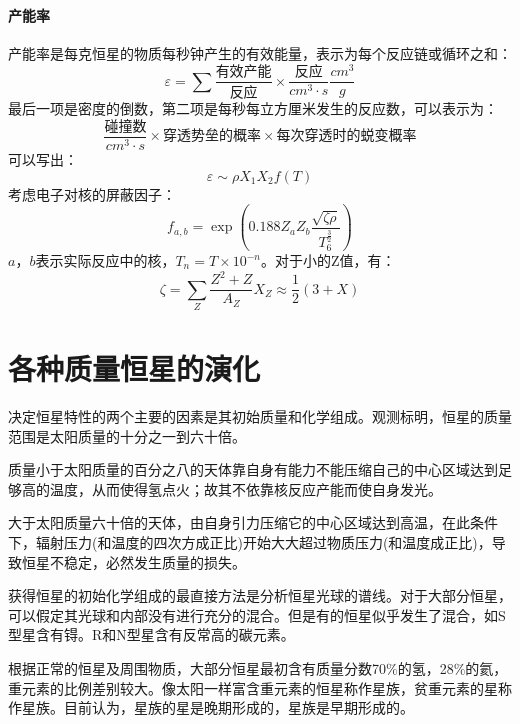 \paragraph{产能率}
产能率是每克恒星的物质每秒钟产生的有效能量，表示为每个反应链或循环之和：
\begin{equation}
	\varepsilon=\sum \frac{\mbox{有效产能}}{\mbox{反应}}\times\frac{\mbox{反应}}{cm^3\cdot s}\frac{cm^3}{g}
\end{equation}
最后一项是密度的倒数，第二项是每秒每立方厘米发生的反应数，可以表示为：
\begin{equation}
	\frac{\mbox{碰撞数}}{cm^3\cdot s}\times \mbox{穿透势垒的概率}\times\mbox{每次穿透时的蜕变概率}
\end{equation}
可以写出：
\begin{equation}
	\varepsilon \sim \rho X_{1}X_{2}f(T)
\end{equation}
考虑电子对核的屏蔽因子：
\begin{equation}
	f_{a,b}=\exp(0.188Z_{a}Z_{b}\frac{\sqrt{\zeta\rho}}{T_{6}^{\frac{3}{2}}})
\end{equation}
$a$，$b$表示实际反应中的核，$T_{n}=T\times 10^{-n}$。对于小的Z值，有：
\begin{equation}
	\zeta=\sum_{Z}\frac{Z^2+Z}{A_{Z}}X_{Z}\approx \frac{1}{2}(3+X)
\end{equation}

\section{各种质量恒星的演化}
决定恒星特性的两个主要的因素是其初始质量和化学组成。观测标明，恒星的质量范围是太阳质量的十分之一到六十倍。

质量小于太阳质量的百分之八的天体靠自身有能力不能压缩自己的中心区域达到足够高的温度，从而使得氢点火；故其不依靠核反应产能而使自身发光。

大于太阳质量六十倍的天体，由自身引力压缩它的中心区域达到高温，在此条件下，辐射压力(和温度的四次方成正比)开始大大超过物质压力(和温度成正比)，导致恒星不稳定，必然发生质量的损失。

获得恒星的初始化学组成的最直接方法是分析恒星光球的谱线。对于大部分恒星，可以假定其光球和内部没有进行充分的混合。但是有的恒星似乎发生了混合，如S型星含有锝。R和N型星含有反常高的碳元素。

根据正常的恒星及周围物质，大部分恒星最初含有质量分数70$\%$的氢，28$\%$的氦，重元素的比例差别较大。像太阳一样富含重元素的恒星称作星族，贫重元素的星称作星族。目前认为，星族的星是晚期形成的，星族是早期形成的。

